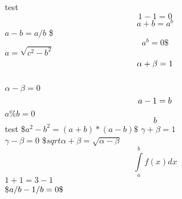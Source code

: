 \documentclass{article}
\newcommand{\test}[2]{#1+1=#2-1}
\begin{document}
test
\[1-1=0\]
$$a+b=a^b$$ $a-b=a/b$
\$$$a^b
=0\$$$
$
a=\sqrt{c^2-b^2}
$
\\$$\alpha+\beta=1
\\$$ \\$\alpha-\beta=0$ $$a-1=b\\$$
$a\%b= %
0$
$$b$$ %
%
test \$$a^2-b^2=(a+b)*(a-b)\$$
$\gamma+\beta=1$
\\$\gamma-\beta=0$
$\$sqrt{\alpha+\beta}=

\sqrt{\alpha-\beta}$
$$\int\limits_a^b f(x)dx$$ $\test{1}{3}$ \\\$$a/b-1/b=0\\\$$
\end{document}
